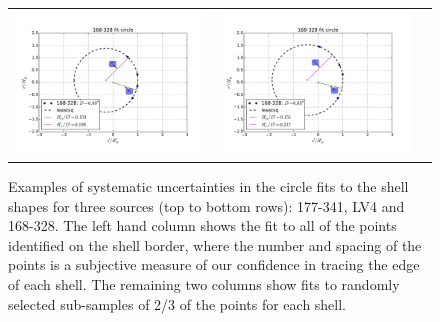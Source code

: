 \begin{figure}
\begin{tabular}{@{}c@{}c@{}c@{}}
  \includegraphics[clip]{../../read-shapes/Multi-Fit/samp00/LV-bowshocks-xyfancy-positionssamp00-168-328} & \includegraphics[clip]{../../read-shapes/Multi-Fit/samp01/LV-bowshocks-xyfancy-positionssamp01-168-328}
\end{tabular}
\label{fig:char-radii-obs}
\caption{Examples of systematic uncertainties in the circle fits to
  the shell shapes for three sources (top to bottom rows): 177-341,
  LV4 and 168-328.  The left hand column shows the fit to all of the
  points identified on the shell border, where the number and spacing
  of the points is a subjective measure of our confidence in tracing
  the edge of each shell. The remaining two columns show fits to
  randomly selected sub-samples of 2/3 of the points for each shell.}
\end{figure}

